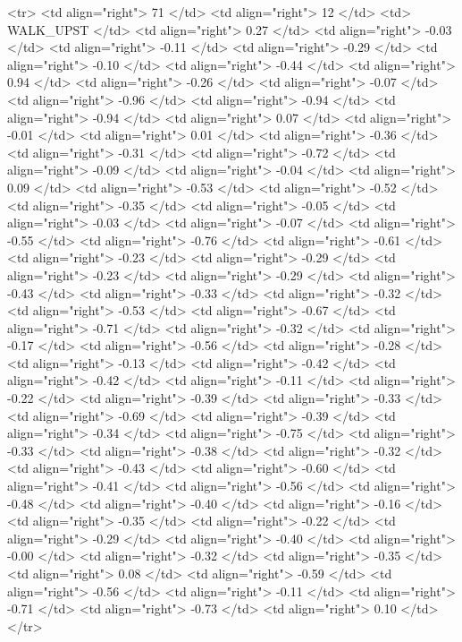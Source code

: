   <tr> <td align="right"> 71 </td> <td align="right">  12 </td> <td> WALK_UPST </td> <td align="right"> 0.27 </td> <td align="right"> -0.03 </td> <td align="right"> -0.11 </td> <td align="right"> -0.29 </td> <td align="right"> -0.10 </td> <td align="right"> -0.44 </td> <td align="right"> 0.94 </td> <td align="right"> -0.26 </td> <td align="right"> -0.07 </td> <td align="right"> -0.96 </td> <td align="right"> -0.94 </td> <td align="right"> -0.94 </td> <td align="right"> 0.07 </td> <td align="right"> -0.01 </td> <td align="right"> 0.01 </td> <td align="right"> -0.36 </td> <td align="right"> -0.31 </td> <td align="right"> -0.72 </td> <td align="right"> -0.09 </td> <td align="right"> -0.04 </td> <td align="right"> 0.09 </td> <td align="right"> -0.53 </td> <td align="right"> -0.52 </td> <td align="right"> -0.35 </td> <td align="right"> -0.05 </td> <td align="right"> -0.03 </td> <td align="right"> -0.07 </td> <td align="right"> -0.55 </td> <td align="right"> -0.76 </td> <td align="right"> -0.61 </td> <td align="right"> -0.23 </td> <td align="right"> -0.29 </td> <td align="right"> -0.23 </td> <td align="right"> -0.29 </td> <td align="right"> -0.43 </td> <td align="right"> -0.33 </td> <td align="right"> -0.32 </td> <td align="right"> -0.53 </td> <td align="right"> -0.67 </td> <td align="right"> -0.71 </td> <td align="right"> -0.32 </td> <td align="right"> -0.17 </td> <td align="right"> -0.56 </td> <td align="right"> -0.28 </td> <td align="right"> -0.13 </td> <td align="right"> -0.42 </td> <td align="right"> -0.42 </td> <td align="right"> -0.11 </td> <td align="right"> -0.22 </td> <td align="right"> -0.39 </td> <td align="right"> -0.33 </td> <td align="right"> -0.69 </td> <td align="right"> -0.39 </td> <td align="right"> -0.34 </td> <td align="right"> -0.75 </td> <td align="right"> -0.33 </td> <td align="right"> -0.38 </td> <td align="right"> -0.32 </td> <td align="right"> -0.43 </td> <td align="right"> -0.60 </td> <td align="right"> -0.41 </td> <td align="right"> -0.56 </td> <td align="right"> -0.48 </td> <td align="right"> -0.40 </td> <td align="right"> -0.16 </td> <td align="right"> -0.35 </td> <td align="right"> -0.22 </td> <td align="right"> -0.29 </td> <td align="right"> -0.40 </td> <td align="right"> -0.00 </td> <td align="right"> -0.32 </td> <td align="right"> -0.35 </td> <td align="right"> 0.08 </td> <td align="right"> -0.59 </td> <td align="right"> -0.56 </td> <td align="right"> -0.11 </td> <td align="right"> -0.71 </td> <td align="right"> -0.73 </td> <td align="right"> 0.10 </td> </tr>
